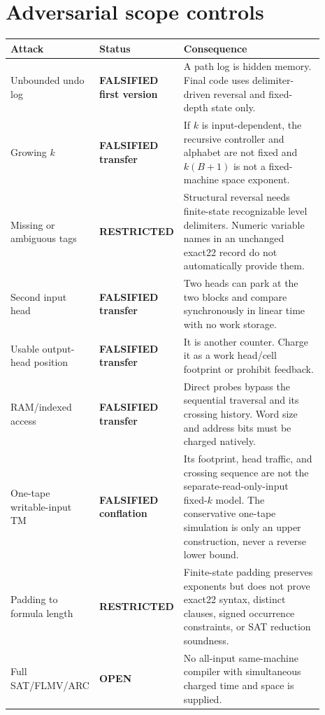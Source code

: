 \documentclass[11pt]{article}
\begin{document}
\section{Adversarial scope controls}
\begin{longtable}{p{0.23\linewidth}p{0.20\linewidth}p{0.46\linewidth}}
\toprule
Attack & Status & Consequence \\
\midrule
Unbounded undo log & \textbf{FALSIFIED first version} & A path log is hidden
memory.  Final code uses delimiter-driven reversal and fixed-depth state only.\\
Growing $k$ & \textbf{FALSIFIED transfer} & If $k$ is input-dependent, the
recursive controller and alphabet are not fixed and $k(B+1)$ is not a
fixed-machine space exponent.\\
Missing or ambiguous tags & \textbf{RESTRICTED} & Structural reversal needs
finite-state recognizable level delimiters.  Numeric variable names in an
unchanged exact22 record do not automatically provide them.\\
Second input head & \textbf{FALSIFIED transfer} & Two heads can park at the
two blocks and compare synchronously in linear time with no work storage.\\
Usable output-head position & \textbf{FALSIFIED transfer} & It is another
counter.  Charge it as a work head/cell footprint or prohibit feedback.\\
RAM/indexed access & \textbf{FALSIFIED transfer} & Direct probes bypass the
sequential traversal and its crossing history.  Word size and address bits
must be charged natively.\\
One-tape writable-input TM & \textbf{FALSIFIED conflation} & Its footprint,
head traffic, and crossing sequence are not the separate-read-only-input
fixed-$k$ model.  The conservative one-tape simulation is only an upper
construction, never a reverse lower bound.\\
Padding to formula length & \textbf{RESTRICTED} & Finite-state padding
preserves exponents but does not prove exact22 syntax, distinct clauses,
signed occurrence constraints, or SAT reduction soundness.\\
Full SAT/FLMV/ARC & \textbf{OPEN} & No all-input same-machine compiler with
simultaneous charged time and space is supplied.\\
\bottomrule
\end{longtable}
\end{document}
